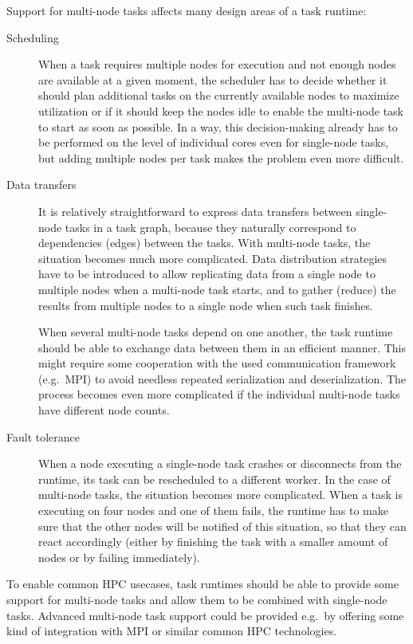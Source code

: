 Support for multi-node tasks affects many design areas of a task runtime:
\begin{description}
    \item[Scheduling] When a task requires multiple nodes for execution and not enough nodes are
    available at a given moment, the scheduler has to decide whether it should plan additional
    tasks on the currently available nodes to maximize utilization or if it should keep the nodes
    idle to enable the multi-node task to start as soon as possible.
    In a way, this decision-making already has to be performed on the level of individual cores
    even for single-node tasks, but adding multiple nodes per task makes the problem even more
    difficult.
    \item[Data transfers] It is relatively straightforward to express data transfers between
    single-node tasks in a task graph, because they naturally correspond to dependencies (edges)
    between the tasks. With multi-node tasks, the situation becomes much more complicated. Data
    distribution strategies have to be introduced to allow replicating data from a single node
    to multiple nodes when a multi-node task starts, and to gather (reduce) the results from
    multiple nodes to a single node when such task finishes.

    When several multi-node tasks depend on one another, the task runtime should be able to
    exchange data between them in an efficient manner. This might require some cooperation with
    the used communication framework (e.g.\ MPI) to avoid needless repeated serialization and
    deserialization. The process becomes even more complicated if the individual multi-node tasks
    have different node counts.
    \item[Fault tolerance] When a node executing a single-node task crashes or disconnects from
    the runtime, its task can be rescheduled to a different worker. In the case of multi-node
    tasks, the situation becomes more complicated. When a task is executing on four nodes and
    one of them fails, the runtime has to make sure that the other nodes will be notified of
    this situation, so that they can react accordingly (either by finishing the task with a
    smaller amount of nodes or by failing immediately).
\end{description}

To enable common HPC usecases, task runtimes should be able to provide some support
for multi-node tasks and allow them to be combined with single-node tasks. Advanced multi-node
task support could be provided e.g.\ by offering some kind of integration with MPI or similar
common HPC technologies.

